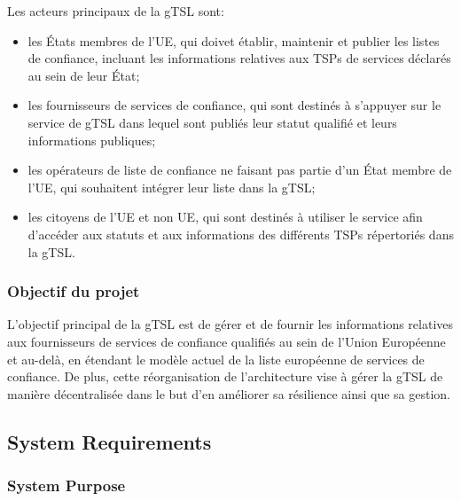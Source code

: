 \documentclass{tnreport}
\begin{document}
Les acteurs principaux de la 
gTSL
sont:
\begin{itemize}
	\item les États membres de l'UE, qui doivet établir, maintenir et publier les listes de confiance, incluant les informations relatives aux TSPs de services déclarés au sein de leur État;
	\item les fournisseurs de services de confiance, qui sont destinés à s'appuyer sur le service de gTSL dans lequel sont publiés leur statut qualifié et leurs informations publiques;
	\item les opérateurs de liste de confiance ne faisant pas partie d'un État membre de l'UE, qui souhaitent intégrer leur liste dans la gTSL;
	\item les citoyens de l'UE et non UE, qui sont destinés à utiliser le service afin d'accéder aux statuts et aux informations des différents TSPs répertoriés dans la gTSL.
\end{itemize}

\subsubsection{Objectif du projet}

L'objectif principal de la gTSL est de gérer et de fournir les informations relatives aux fournisseurs de services de confiance qualifiés au sein de l'Union Européenne et au-delà, en étendant le modèle actuel de la liste européenne de services de confiance. De plus, cette réorganisation de l'architecture vise à gérer la gTSL de manière décentralisée dans le but d'en améliorer sa résilience ainsi que sa gestion.

\subsection{System Requirements}

\subsubsection{System Purpose}
\end{document}
